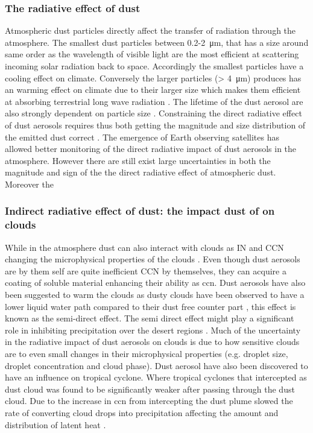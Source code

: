 \subsubsection{The radiative effect of dust}
Atmospheric dust particles directly affect the transfer of radiation through the atmosphere. The smallest dust particles between 0.2-\SI{2}{\micro\metre}, that has a size around same order as the wavelength of visible light are the most efficient at scattering incoming solar radiation back to space. Accordingly the smallest particles have a cooling effect on climate. Conversely the larger particles (> \SI{4}{\micro\metre}) produces has an warming effect on climate due to their larger size which makes them efficient at absorbing terrestrial long wave radiation \parencite{choobari2014global}.
The lifetime of the dust aerosol are also strongly dependent on particle size \parencite{mahowald2014size}. Constraining the direct radiative effect of dust aerosols requires thus both getting the magnitude and size distribution of the emitted dust correct \parencite{adebiyi2020dust}. The emergence of Earth observing satellites has allowed better monitoring of the direct radiative impact of dust aerosols in the atmosphere. However there are still exist large uncertainties in both the magnitude and sign of the the direct radiative effect of atmospheric dust. Moreover the 
\subsubsection{Indirect radiative effect of dust: the impact dust of on clouds}
While in the atmosphere dust can also interact with clouds as IN and CCN changing the microphysical properties of the clouds \parencite{lohmann2006sensitivity}. Even though dust aerosols are by them self are quite inefficient CCN by themselves, they can acquire a coating of soluble material enhancing their ability as \acrshort{ccn}. Dust aerosols have also been suggested to warm the clouds as dusty clouds have been observed to have a lower liquid water path compared to their dust free counter part \parencite{huang2006satellite}, this effect is known as the semi-direct effect. The semi direct effect might play a significant role in inhibiting precipitation over the desert regions \parencite{shao2011dust}. Much of the uncertainty in the radiative impact of dust aerosols on clouds is due to how sensitive clouds are to even small changes in their microphysical properties (e.g. droplet size, droplet concentration and cloud phase). Dust aerosol have also been discovered to have an influence on tropical cyclone. Where tropical cyclones that intercepted as dust cloud was found to be significantly weaker after passing through the dust cloud. Due to the increase in \acrshort{ccn} from intercepting the dust plume slowed the rate of converting cloud drops into precipitation affecting the amount and distribution of latent heat \parencite{rosenfeld2011pollution}.  
